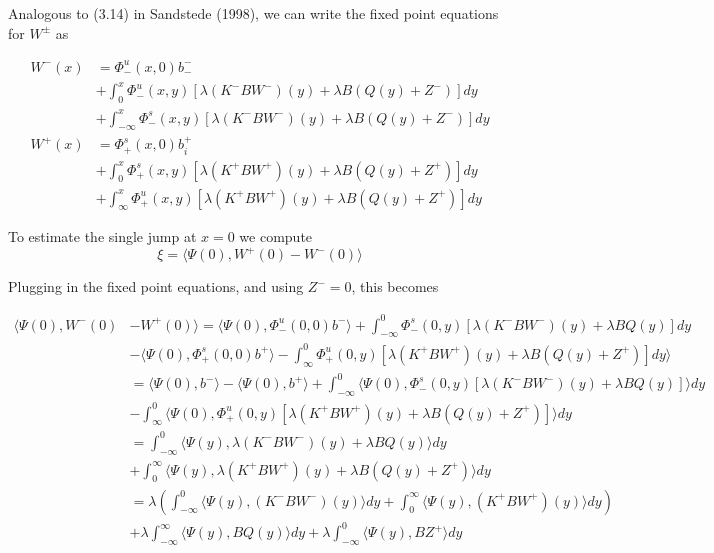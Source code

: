 \documentclass[12pt]{article}
\begin{document}
Analogous to (3.14) in Sandstede (1998), we can write the fixed point equations for $W^\pm$ as

\begin{align*}
W^-(x) &= \Phi^u_-(x, 0)b_-^- \\
&+ \int_0^x \Phi^u_-(x, y)[\lambda (K^- B W^-)(y) + \lambda B (Q(y) + Z^-) ] dy \\
&+ \int_{-\infty}^x \Phi^s_-(x, y)[\lambda (K^- B W^-)(y) + \lambda B (Q(y) + Z^-)] dy \\
W^+(x) &= \Phi^s_+(x, 0)b_i^+ \\
&+ \int_0^x \Phi^s_+(x, y)[\lambda (K^+ B W^+)(y) + \lambda B(Q(y) + Z^+)] dy \\
&+ \int_{\infty}^x \Phi^u_+(x, y)[\lambda (K^+ B W^+)(y) + \lambda B (Q(y) + Z^+) ] dy
\end{align*}

To estimate the single jump at $x = 0$ we compute
\[
\xi = \langle \Psi(0), W^+(0) - W^-(0) \rangle
\]

Plugging in the fixed point equations, and using $Z^- = 0$, this becomes

\begin{align*}
\langle\Psi(0), W^-(0) &- W^+(0)\rangle = \langle \Psi(0), \Phi^u_-(0, 0)b^- \rangle + \int_{-\infty}^0 \Phi^s_-(0, y)[\lambda (K^- B W^-)(y) + \lambda B Q(y) ] dy  \\
&- \langle \Psi(0), \Phi^s_+(0, 0)b^+ \rangle - \int_\infty^0 \Phi^u_+(0, y)[\lambda (K^+ B W^+)(y) + \lambda B (Q(y) + Z^+) ] dy \rangle\\
&= \langle \Psi(0), b^- \rangle - \langle \Psi(0), b^+ \rangle + \int_{-\infty}^0 \langle \Psi(0), \Phi^s_-(0, y)[\lambda (K^- B W^-)(y) + \lambda B Q(y) ] \rangle dy  \\
&- \int_\infty^0 \langle \Psi(0), \Phi^u_+(0, y)[\lambda (K^+ B W^+)(y) + \lambda B (Q(y) + Z^+) ] \rangle dy  \\
&= \int_{-\infty}^0 \langle \Psi(y), \lambda (K^- B W^-)(y) + \lambda B Q(y) \rangle dy \\
&+ \int_0^\infty \langle \Psi(y), \lambda (K^+ B W^+)(y) + \lambda B (Q(y) + Z^+)  \rangle dy \\
&= \lambda\left( \int_{-\infty}^0 \langle \Psi(y), (K^- B W^-)(y) \rangle dy + \int_0^\infty \langle \Psi(y), (K^+ B W^+)(y) \rangle dy \right) \\
&+ \lambda \int_{-\infty}^\infty \langle\Psi(y), BQ(y) \rangle dy + \lambda \int_{-\infty}^0 \langle \Psi(y), B Z^+ \rangle dy
\end{align*}
\end{document}
